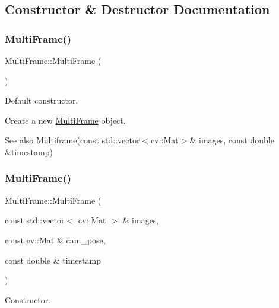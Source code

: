\subsection{Constructor \& Destructor Documentation}
\mbox{\label{classMultiFrame_a08ec547ed70cf94539b3a52c2b51363b}} 
\subsubsection{\texorpdfstring{Multi\+Frame()}{MultiFrame()}\hspace{0.1cm}{\footnotesize\ttfamily [1/2]}}
{\footnotesize\ttfamily Multi\+Frame\+::\+Multi\+Frame (\begin{DoxyParamCaption}{ }\end{DoxyParamCaption})\hspace{0.3cm}{\ttfamily [inline]}}



Default constructor. 

Create a new \hyperlink{classMultiFrame}{Multi\+Frame} object. \begin{DoxySeeAlso}{See also}
Multiframe(const std\+::vector$<$cv\+::\+Mat$>$\& images, const double \&timestamp) 
\end{DoxySeeAlso}
\mbox{\label{classMultiFrame_a381ae26db28aaf27bf0966e274a36e2a}} 
\subsubsection{\texorpdfstring{Multi\+Frame()}{MultiFrame()}\hspace{0.1cm}{\footnotesize\ttfamily [2/2]}}
{\footnotesize\ttfamily Multi\+Frame\+::\+Multi\+Frame (\begin{DoxyParamCaption}\item[{const std\+::vector$<$ cv\+::\+Mat $>$ \&}]{images,  }\item[{const cv\+::\+Mat \&}]{cam\+\_\+pose,  }\item[{const double \&}]{timestamp }\end{DoxyParamCaption})}



Constructor. 

